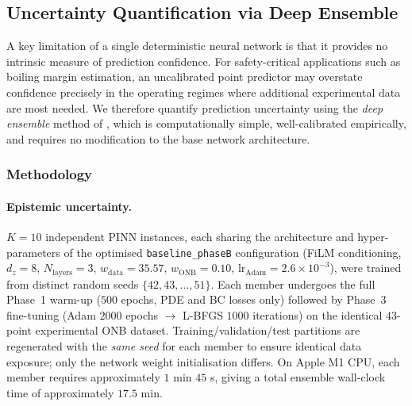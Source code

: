 %

\subsection{Uncertainty Quantification via Deep Ensemble}
\label{sec:uq_ensemble}

A key limitation of a single deterministic neural network is that it provides
no intrinsic measure of prediction confidence.  For safety-critical applications
such as boiling margin estimation, an uncalibrated point predictor may
overstate confidence precisely in the operating regimes where additional
experimental data are most needed.  We therefore quantify prediction uncertainty
using the \emph{deep ensemble} method of
\citet{lakshminarayanan2017}, which is computationally simple, well-calibrated
empirically, and requires no modification to the base network architecture.

\subsubsection{Methodology}

\paragraph{Epistemic uncertainty.}
$K = 10$ independent PINN instances, each sharing the architecture and
hyper-parameters of the optimised \texttt{baseline\_phaseB} configuration
(FiLM conditioning, $d_z = 8$, $N_\mathrm{layers} = 3$,
$w_\mathrm{data} = 35.57$, $w_\mathrm{ONB} = 0.10$,
$\mathrm{lr}_\mathrm{Adam} = 2.6 \times 10^{-3}$), were trained from distinct
random seeds $\{42, 43, \ldots, 51\}$.  Each member undergoes the full
Phase~1 warm-up ($500$ epochs, PDE and BC losses only) followed by Phase~3
fine-tuning (Adam $2000$ epochs $\to$ L-BFGS $1000$ iterations) on the
identical 43-point experimental ONB dataset.  Training/validation/test
partitions are regenerated with the \emph{same seed} for each member to
ensure identical data exposure; only the network weight initialisation
differs.  On Apple M1 CPU, each member requires approximately $1$ min
$45$ s, giving a total ensemble wall-clock time of approximately $17.5$ min.

